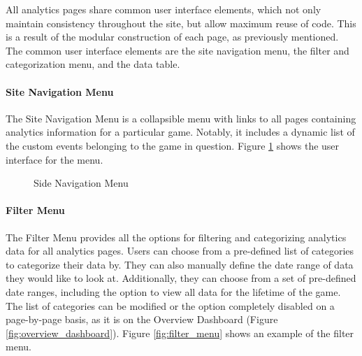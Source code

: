 All analytics pages share common user interface elements, which not only maintain consistency throughout the site, but allow maximum reuse of code. This is a result of the modular construction of each page, as previously mentioned. The common user interface elements are the site navigation menu, the filter and categorization menu, and the data table. 

\paragraph{Site Navigation Menu}

The Site Navigation Menu is a collapsible menu with links to all pages containing analytics information for a particular game. Notably, it includes a dynamic list of the custom events belonging to the game in question. Figure \ref{fig:nav_menu} shows the user interface for the menu.

\begin{figure}[htb]
	\caption{\label{fig:nav_menu} Side Navigation Menu}
\end{figure}

\paragraph{Filter Menu}

The Filter Menu provides all the options for filtering and categorizing analytics data for all analytics pages. Users can choose from a pre-defined list of categories to categorize their data by. They can also manually define the date range of data they would like to look at. Additionally, they can choose from a set of pre-defined date ranges, including the option to view all data for the lifetime of the game. The list of categories can be modified or the option completely disabled on a page-by-page basis, as it is on the Overview Dashboard (Figure \ref{fig:overview_dashboard}). Figure \ref{fig:filter_menu} shows an example of the filter menu. 

